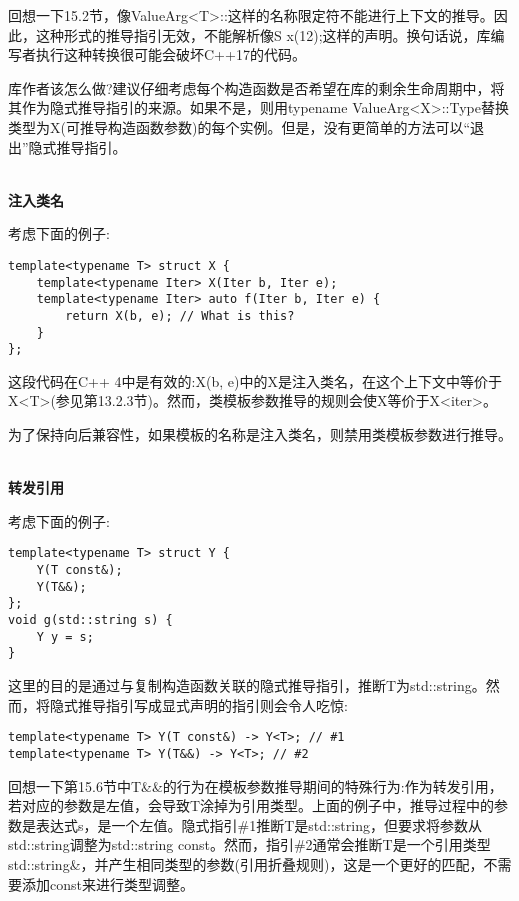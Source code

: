 回想一下15.2节，像ValueArg<T>::这样的名称限定符不能进行上下文的推导。因此，这种形式的推导指引无效，不能解析像S x(12);这样的声明。换句话说，库编写者执行这种转换很可能会破坏C++17的代码。

库作者该怎么做?建议仔细考虑每个构造函数是否希望在库的剩余生命周期中，将其作为隐式推导指引的来源。如果不是，则用typename ValueArg<X>::Type替换类型为X(可推导构造函数参数)的每个实例。但是，没有更简单的方法可以“退出”隐式推导指引。




\hspace*{\fill} \\ %
\noindent
\textbf{注入类名}

考虑下面的例子:

\begin{lstlisting}[style=styleCXX]
template<typename T> struct X {
	template<typename Iter> X(Iter b, Iter e);
	template<typename Iter> auto f(Iter b, Iter e) {
		return X(b, e); // What is this?
	}
};
\end{lstlisting}

这段代码在C++ 4中是有效的:X(b, e)中的X是注入类名，在这个上下文中等价于X<T>(参见第13.2.3节)。然而，类模板参数推导的规则会使X等价于X<iter>。

为了保持向后兼容性，如果模板的名称是注入类名，则禁用类模板参数进行推导。


\hspace*{\fill} \\ %
\noindent
\textbf{转发引用}

考虑下面的例子:

\begin{lstlisting}[style=styleCXX]
template<typename T> struct Y {
	Y(T const&);
	Y(T&&);
};
void g(std::string s) {
	Y y = s;
}
\end{lstlisting}

这里的目的是通过与复制构造函数关联的隐式推导指引，推断T为std::string。然而，将隐式推导指引写成显式声明的指引则会令人吃惊:

\begin{lstlisting}[style=styleCXX]
template<typename T> Y(T const&) -> Y<T>; // #1
template<typename T> Y(T&&) -> Y<T>; // #2
\end{lstlisting}

回想一下第15.6节中T\&\&的行为在模板参数推导期间的特殊行为:作为转发引用，若对应的参数是左值，会导致T涂掉为引用类型。上面的例子中，推导过程中的参数是表达式s，是一个左值。隐式指引\#1推断T是std::string，但要求将参数从std::string调整为std::string const。然而，指引\#2通常会推断T是一个引用类型std::string\&，并产生相同类型的参数(引用折叠规则)，这是一个更好的匹配，不需要添加const来进行类型调整。

